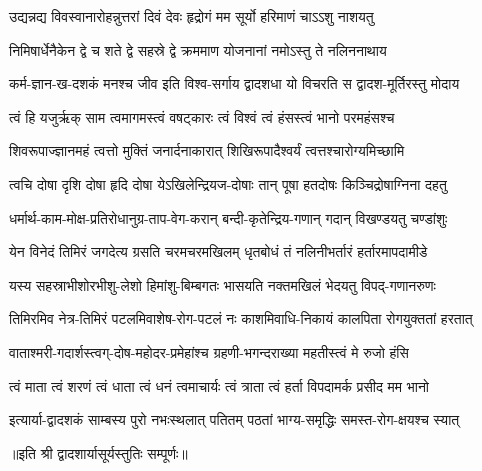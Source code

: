 

\twolineshloka
{उद्यन्नद्य विवस्वानारोहन्नुत्तरां दिवं देवः}
{हृद्रोगं मम सूर्यो हरिमाणं चाऽऽशु नाशयतु}%

\twolineshloka
{निमिषार्धेनैकेन द्वे च शते द्वे सहस्रे द्वे}
{क्रममाण योजनानां नमोऽस्तु ते नलिननाथाय}%

\twolineshloka
{कर्म-ज्ञान-ख-दशकं मनश्च जीव इति विश्व-सर्गाय}
{द्वादशधा यो विचरति स द्वादश-मूर्तिरस्तु मोदाय}%

\twolineshloka
{त्वं हि यजुर्ऋक् साम त्वमागमस्त्वं वषट्कारः}
{त्वं विश्वं त्वं हंसस्त्वं भानो परमहंसश्च}%

\twolineshloka
{शिवरूपाज्ज्ञानमहं त्वत्तो मुक्तिं जनार्दनाकारात्}
{शिखिरूपादैश्वर्यं त्वत्तश्चारोग्यमिच्छामि}%

\twolineshloka
{त्वचि दोषा दृशि दोषा हृदि दोषा येऽखिलेन्द्रियज-दोषाः}
{तान् पूषा हतदोषः किञ्चिद्रोषाग्निना दहतु}%

\twolineshloka
{धर्मार्थ-काम-मोक्ष-प्रतिरोधानुग्र-ताप-वेग-करान्}
{बन्दी-कृतेन्द्रिय-गणान् गदान् विखण्डयतु चण्डांशुः}%

\twolineshloka
{येन विनेदं तिमिरं जगदेत्य ग्रसति चरमचरमखिलम्}
{धृतबोधं तं नलिनीभर्तारं हर्तारमापदामीडे}%

\twolineshloka
{यस्य सहस्राभीशोरभीशु-लेशो हिमांशु-बिम्बगतः}
{भासयति नक्तमखिलं भेदयतु विपद्-गणानरुणः}%

\twolineshloka
{तिमिरमिव नेत्र-तिमिरं पटलमिवाशेष-रोग-पटलं नः}
{काशमिवाधि-निकायं कालपिता रोगयुक्ततां हरतात्}%

\twolineshloka
{वाताश्मरी-गदार्शस्त्वग्-दोष-महोदर-प्रमेहांश्च}
{ग्रहणी-भगन्दराख्या महतीस्त्वं मे रुजो हंसि}%

\twolineshloka
{त्वं माता त्वं शरणं त्वं धाता त्वं धनं त्वमाचार्यः}
{त्वं त्राता त्वं हर्ता विपदामर्क प्रसीद मम भानो}%

\twolineshloka
{इत्यार्या-द्वादशकं साम्बस्य पुरो नभःस्थलात् पतितम्}
{पठतां भाग्य-समृद्धिः समस्त-रोग-क्षयश्च स्यात्}%


॥इति श्री द्वादशार्यासूर्यस्तुतिः सम्पूर्णः॥